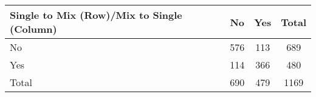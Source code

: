 {
\def\sym#1{\ifmmode^{#1}\else\(^{#1}\)\fi}
\begin{tabular}{l*{3}{c}}
\toprule
Single to Mix (Row)/Mix to Single (Column)&          No&         Yes&       Total\\
\midrule
No          &         576&         113&         689\\
Yes         &         114&         366&         480\\
Total       &         690&         479&        1169\\
\bottomrule
\end{tabular}
}
